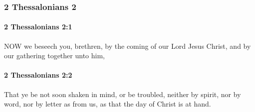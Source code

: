 	\subsubsection{2 Thessalonians 2} %
		\label{2THESSALONIANS-2}
		
		\paragraph{2 Thessalonians 2:1} %
			\label{2THESSALONIANS-2-1}

			NOW we beseech you, brethren, by the coming of our Lord Jesus Christ, and by our gathering together unto him,

			\begin{framed}
			\scriptsize
				\begin{compactdesc}
					\item[SBLG] 
				\end{compactdesc}
			\end{framed}

		\paragraph{2 Thessalonians 2:2} %
			\label{2THESSALONIANS-2-2}

			That ye be not soon shaken in mind, or be troubled, neither by spirit, nor by word, nor by letter as from us, as that the day of Christ is at hand.

